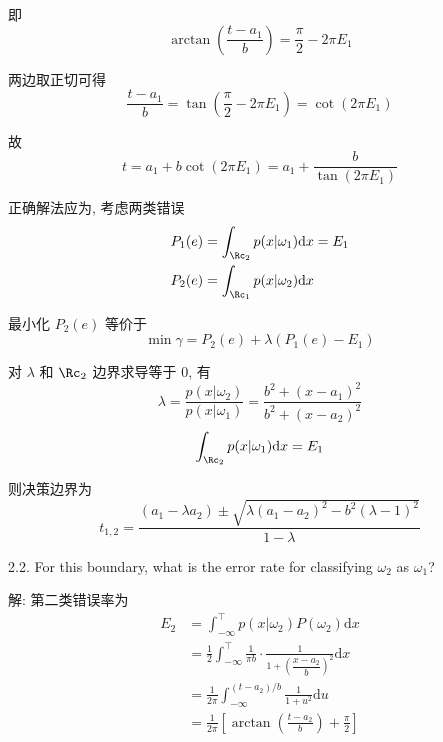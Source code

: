 \documentclass[openany]{ctexbook}
\theoremstyle{kaiti}
\theoremstyle{normal}
\begin{document}
即
\begin{equation}
  \arctan\left(\frac{t-a_1}{b}\right)=\frac{\pi}{2}-2\pi E_1
\end{equation}

两边取正切可得
\begin{equation}
  \frac{t-a_1}{b}=\tan\left(\frac{\pi}{2}-2\pi E_1\right)=\cot(2\pi E_1)
\end{equation}

故
\begin{equation}
  t=a_1+b\cot(2\pi E_1)=a_1+\frac{b}{\tan(2\pi E_1)}
\end{equation}

正确解法应为, 考虑两类错误
\begin{equation}
  \begin{aligned}
    P_1(e)&=\int_{\Rc_2}p(x|\omega_1)\mathrm{d}x=E_1\\
    P_2(e)&=\int_{\Rc_1}p(x|\omega_2)\mathrm{d}x\\
  \end{aligned}
\end{equation}

最小化 $P_2(e)$ 等价于
\begin{equation}
  \min\gamma=P_2(e)+\lambda(P_1(e)-E_1)
\end{equation}

对 $\lambda$ 和 $\Rc_2$ 边界求导等于 0, 有
\begin{equation}
    \lambda=\frac{p(x|\omega_2)}{p(x|\omega_1)}=\frac{b^2+(x-a_1)^2}{b^2+(x-a_2)^2}
\end{equation}
\begin{equation}
  \int_{\Rc_2}p(x|\omega_1)\mathrm{d}x=E_1
\end{equation}

则决策边界为
\begin{equation}
  t_{1,2}=\frac{(a_1-\lambda a_2)\pm\sqrt{\lambda(a_1-a_2)^2-b^2(\lambda-1)^2}}{1-\lambda}
\end{equation}

2.2. For this boundary, what is the error rate for classifying $\omega_{2}$ as $\omega_{1}$?

解: 第二类错误率为
\begin{equation}
  \begin{aligned}
    E_2
    &=\int_{-\infty}^{\top} p(x|\omega_2)P(\omega_2)\mathrm{d}x\\
    &=\frac{1}{2}\int_{-\infty}^{\top}\frac{1}{\pi b} \cdot \frac{1}{1+\left(\dfrac{x-a_2}{b}\right)^2}\mathrm{d}x\\
    &=\frac{1}{2\pi}\int_{-\infty}^{(t-a_2)/b}\frac{1}{1+u^2}\mathrm{d}u\\
    &=\frac{1}{2\pi}\left[\arctan\left(\frac{t-a_2}{b}\right)+\frac{\pi}{2}\right]
  \end{aligned}
\end{equation}
\end{document}
